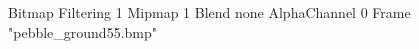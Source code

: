 {Bitmap
	{Filtering 1}
	{Mipmap 1}
	{Blend none}
	{AlphaChannel 0}
	{Frame "pebble_ground55.bmp"}
}
